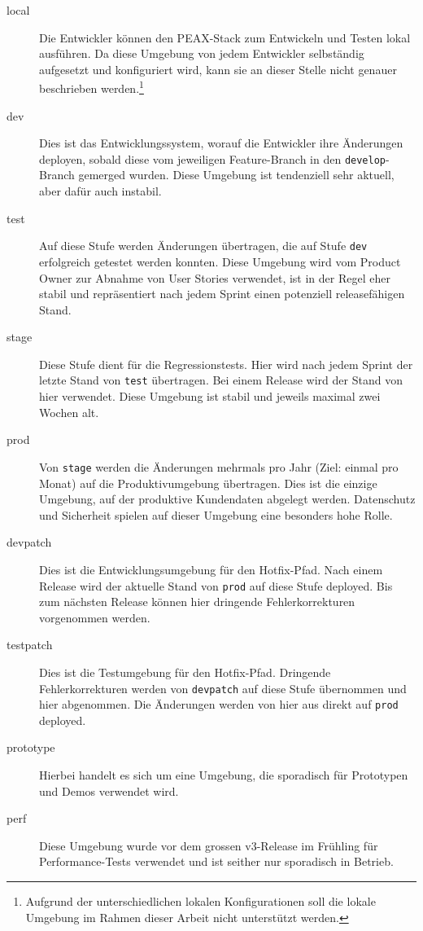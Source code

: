 \begin{description}
    \item[local] Die Entwickler können den PEAX-Stack zum Entwickeln und Testen lokal ausführen. Da diese Umgebung von jedem Entwickler selbständig aufgesetzt und konfiguriert wird, kann sie an dieser Stelle nicht genauer beschrieben werden.\footnote{Aufgrund der unterschiedlichen lokalen Konfigurationen soll die lokale Umgebung im Rahmen dieser Arbeit nicht unterstützt werden.}
    \item[dev] Dies ist das Entwicklungssystem, worauf die Entwickler ihre Änderungen deployen, sobald diese vom jeweiligen Feature-Branch in den \texttt{develop}-Branch gemerged wurden. Diese Umgebung ist tendenziell sehr aktuell, aber dafür auch instabil.
    \item[test] Auf diese Stufe werden Änderungen übertragen, die auf Stufe \texttt{dev} erfolgreich getestet werden konnten. Diese Umgebung wird vom Product Owner zur Abnahme von User Stories verwendet, ist in der Regel eher stabil und repräsentiert nach jedem Sprint einen potenziell releasefähigen Stand.
    \item[stage] Diese Stufe dient für die Regressionstests. Hier wird nach jedem Sprint der letzte Stand von \texttt{test} übertragen. Bei einem Release wird der Stand von hier verwendet. Diese Umgebung ist stabil und jeweils maximal zwei Wochen alt.
    \item[prod] Von \texttt{stage} werden die Änderungen mehrmals pro Jahr (Ziel: einmal pro Monat) auf die Produktivumgebung übertragen. Dies ist die einzige Umgebung, auf der produktive Kundendaten abgelegt werden. Datenschutz und Sicherheit spielen auf dieser Umgebung eine besonders hohe Rolle.
    \item[devpatch] Dies ist die Entwicklungsumgebung für den Hotfix-Pfad. Nach einem Release wird der aktuelle Stand von \texttt{prod} auf diese Stufe deployed. Bis zum nächsten Release können hier dringende Fehlerkorrekturen vorgenommen werden.
    \item[testpatch] Dies ist die Testumgebung für den Hotfix-Pfad. Dringende Fehlerkorrekturen werden von \texttt{devpatch} auf diese Stufe übernommen und hier abgenommen. Die Änderungen werden von hier aus direkt auf \texttt{prod} deployed.
    \item[prototype] Hierbei handelt es sich um eine Umgebung, die sporadisch für Prototypen und Demos verwendet wird.
    \item[perf] Diese Umgebung wurde vor dem grossen v3-Release im Frühling für Performance-Tests verwendet und ist seither nur sporadisch in Betrieb.
\end{description}

